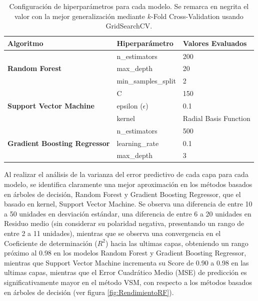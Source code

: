 \begin{table}[h!] %
	\centering
	\caption{Configuración de hiperparámetros para cada modelo. Se remarca en negrita el valor con la mejor generalización mediante $k$-Fold Cross-Validation usando GridSearchCV.}
	\label{tab:hiperparametros-modelos-resultados} 
	\small 
	\begin{tabular}{lll}
		\toprule
		\textbf{Algoritmo}                      & \textbf{Hiperparámetro} & \textbf{Valores Evaluados} \\
		\midrule
		\multirow{3}{*}{\textbf{Random Forest}} & n\_estimators           & 200\\
		                                        & max\_depth              & 20 \\
		                                        & min\_samples\_split     & 2 \\
		\midrule
		\multirow{3}{*}{\textbf{Support Vector Machine}} & C                     & 150 \\
	                                                     & epsilon ($\epsilon$)  & 0.1 \\
		                                                 & kernel                & Radial Basis Function\\
		\midrule
		\multirow{3}{*}{\textbf{Gradient Boosting Regressor}} & n\_estimators    & 500 \\
		                                                      & learning\_rate   & 0.1\\
	                  	                                      & max\_depth       & 3 \\
		\bottomrule
	\end{tabular}
\end{table}


Al realizar el análisis de la varianza del error predictivo de cada capa para cada modelo, se identifica claramente una mejor aproximación en los métodos basados en árboles de decisión, Random Forest y Gradient Boosting Regressor, que el basado en kernel, Support Vector Machine. Se observa una diferencia de entre 10 a 50 unidades en desviación estándar, una diferencia de entre  6 a 20 unidades en Residuo medio (sin considerar su polaridad negativa, presentando un rango de entre 2 a 11 unidades), mientras que se observa una convergencia en el Coeficiente de determinación ($R^2$) hacia las ultimas capas, obteniendo un rango próximo al 0.98 en los modelos Random Forest y Gradient Boosting Regressor, mientras que Support Vector Machine incrementa su Score de 0.90 a 0.98 en las ultimas capas, mientras que el Error Cuadrático Medio (MSE) de predicción es significativamente mayor en el método VSM, con respecto a los métodos basados en árboles de decisión (ver figura \ref{fig:RendimientoRF}).

